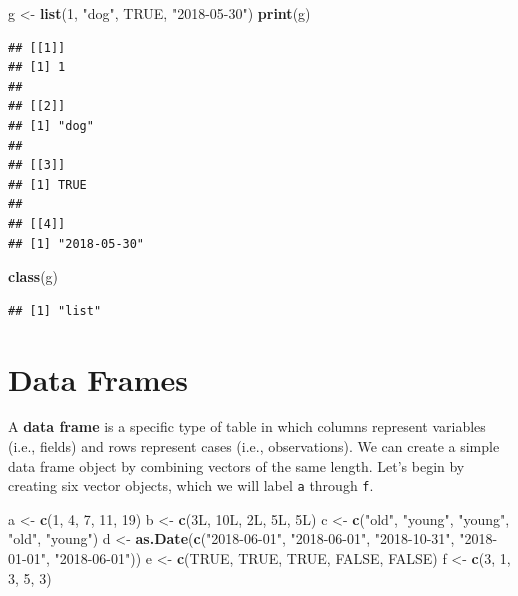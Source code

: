 \documentclass[]{book}
\newenvironment{Shaded}{\begin{snugshade}}{\end{snugshade}}
\newcommand{\KeywordTok}[1]{\textcolor[rgb]{0.13,0.29,0.53}{\textbf{#1}}}
\newcommand{\DecValTok}[1]{\textcolor[rgb]{0.00,0.00,0.81}{#1}}
\newcommand{\StringTok}[1]{\textcolor[rgb]{0.31,0.60,0.02}{#1}}
\newcommand{\OtherTok}[1]{\textcolor[rgb]{0.56,0.35,0.01}{#1}}
\newcommand{\NormalTok}[1]{#1}
\begin{document}
\begin{Shaded}
\begin{Highlighting}[]
\NormalTok{g <-}\StringTok{ }\KeywordTok{list}\NormalTok{(}\DecValTok{1}\NormalTok{, }\StringTok{"dog"}\NormalTok{, }\OtherTok{TRUE}\NormalTok{, }\StringTok{"2018-05-30"}\NormalTok{)}
\KeywordTok{print}\NormalTok{(g)}
\end{Highlighting}
\end{Shaded}

\begin{verbatim}
## [[1]]
## [1] 1
## 
## [[2]]
## [1] "dog"
## 
## [[3]]
## [1] TRUE
## 
## [[4]]
## [1] "2018-05-30"
\end{verbatim}

\begin{Shaded}
\begin{Highlighting}[]
\KeywordTok{class}\NormalTok{(g)}
\end{Highlighting}
\end{Shaded}

\begin{verbatim}
## [1] "list"
\end{verbatim}

\section{Data Frames}\label{data-frames}

A \textbf{data frame} is a specific type of table in which columns
represent variables (i.e., fields) and rows represent cases (i.e.,
observations). We can create a simple data frame object by combining
vectors of the same length. Let's begin by creating six vector objects,
which we will label \texttt{a} through \texttt{f}.

\begin{Shaded}
\begin{Highlighting}[]
\NormalTok{a <-}\StringTok{ }\KeywordTok{c}\NormalTok{(}\DecValTok{1}\NormalTok{, }\DecValTok{4}\NormalTok{, }\DecValTok{7}\NormalTok{, }\DecValTok{11}\NormalTok{, }\DecValTok{19}\NormalTok{) }
\NormalTok{b <-}\StringTok{ }\KeywordTok{c}\NormalTok{(3L, 10L, 2L, 5L, 5L) }
\NormalTok{c <-}\StringTok{ }\KeywordTok{c}\NormalTok{(}\StringTok{"old"}\NormalTok{, }\StringTok{"young"}\NormalTok{, }\StringTok{"young"}\NormalTok{, }\StringTok{"old"}\NormalTok{, }\StringTok{"young"}\NormalTok{) }
\NormalTok{d <-}\StringTok{ }\KeywordTok{as.Date}\NormalTok{(}\KeywordTok{c}\NormalTok{(}\StringTok{"2018-06-01"}\NormalTok{, }\StringTok{"2018-06-01"}\NormalTok{, }\StringTok{"2018-10-31"}\NormalTok{, }\StringTok{"2018-01-01"}\NormalTok{, }\StringTok{"2018-06-01"}\NormalTok{)) }
\NormalTok{e <-}\StringTok{ }\KeywordTok{c}\NormalTok{(}\OtherTok{TRUE}\NormalTok{, }\OtherTok{TRUE}\NormalTok{, }\OtherTok{TRUE}\NormalTok{, }\OtherTok{FALSE}\NormalTok{, }\OtherTok{FALSE}\NormalTok{)}
\NormalTok{f <-}\StringTok{ }\KeywordTok{c}\NormalTok{(}\DecValTok{3}\NormalTok{, }\DecValTok{1}\NormalTok{, }\DecValTok{3}\NormalTok{, }\DecValTok{5}\NormalTok{, }\DecValTok{3}\NormalTok{)}
\end{Highlighting}
\end{Shaded}
\end{document}
